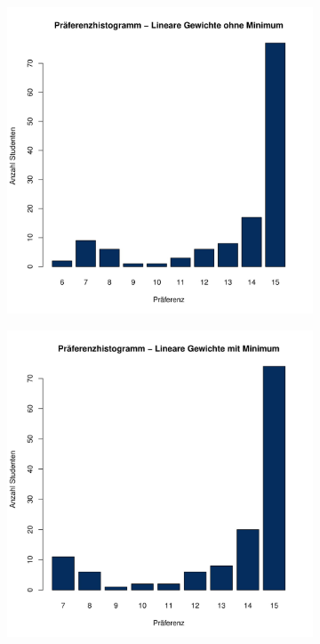 			\begin{figure}
				\centering
				\begin{subfigure}{0.3\textwidth}
					\includegraphics[width=1.0\textwidth]{./testing/images/NormalDistPreferencesHistLin.jpg}
				\end{subfigure}
				\begin{subfigure}{0.30\textwidth}
					\includegraphics[width=1.0\textwidth]{./testing/images/NormalDistPreferencesHistLinMin.jpg}

\end{subfigure}
\end{figure}
